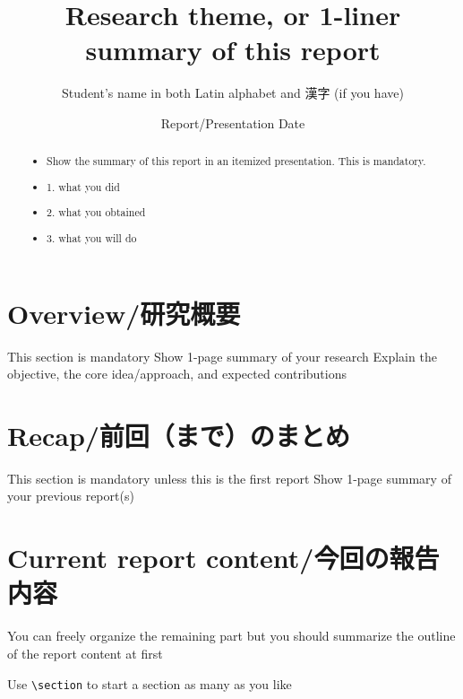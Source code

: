 \documentclass[]{lrlabreport}
\title{Research theme, or 1-liner summary of this report}
\author{Student's name in both Latin alphabet and 漢字 (if you have)}
\date{Report/Presentation Date}
\begin{document}
\maketitle
\begin{abstract}
\noindent\begin{itemize}
    \item Show the summary of this report in an itemized presentation. This is mandatory.
    \item 1. what you did
    \item 2. what you obtained
    \item 3. what you will do
\end{itemize}
\end{abstract}
\thispagestyle{empty}


\section{Overview/研究概要}

\I This section is mandatory
\I Show 1-page summary of your research 
\I Explain the objective, the core idea/approach, and expected contributions


\section{Recap/前回（まで）のまとめ}

\I This section is mandatory unless this is the first report
\I Show 1-page summary of your previous report(s)


\section{Current report content/今回の報告内容}

\I You can freely organize the remaining part but you should summarize the outline of the report content at first

\I Use \verb|\section| to start a section as many as you like
\end{document}
